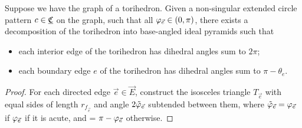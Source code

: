 \begin{lemma}
\label{l:circpattern_polyhedra}
Suppose we have the graph of a torihedron.
Given a non-singular extended circle pattern $c \in {\underline{\mathfrak{C}}}$ on the graph,
such that all $\varphi_{\vec{e}} \in (0,\pi)$,
there exists a decomposition of the torihedron
into base-angled ideal pyramids such that
	\begin{itemize}
		\item each interior edge of the torihedron has dihedral angles sum to $2\pi$;
		\item each boundary edge $e$ of the torihedron has dihedral angles sum to
			$\pi - \theta_e$.
	\end{itemize}
\end{lemma}

\begin{proof}
For each directed edge $\vec{e} \in \vec{E}$,
construct the isosceles triangle $T_{\vec{e}}$
with equal sides of length $r_{f_{\vec{e}}}$ and
angle $2\tilde{\varphi}_{\vec{e}}$ subtended between them,
where $\tilde{\varphi}_{\vec{e}} = \varphi_{\vec{e}}$
if $\varphi_{\vec{e}}$ if it is acute,
and = $\pi - \varphi_{\vec{e}}$ otherwise.


\end{proof}
